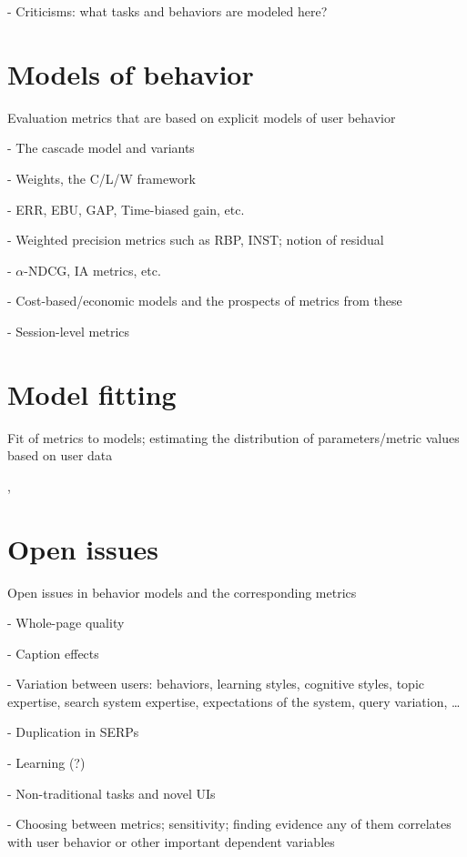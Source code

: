 \documentclass[openany]{now} %
\begin{document}
- Criticisms: what tasks and behaviors are modeled here?

\section{Models of behavior}

Evaluation metrics that are based on explicit models of user behavior

- The cascade model and variants

- Weights, the C/L/W framework \citep{Moffat2013}

- ERR, EBU, GAP, Time-biased gain, etc.

- Weighted precision metrics such as RBP, INST; notion of residual \citep{Moffat08,Moffat15}

- $\alpha$-NDCG, IA metrics, etc.

- Cost-based/economic models and the prospects of metrics from these

- Session-level metrics \cite{kanoulas2011evaluating} \cite{Järvelin2008}

\section{Model fitting}

Fit of metrics to models; estimating the distribution of parameters/metric values based on user data

\cite{CarteretteKY11}, \cite{Moffat2013}

\section{Open issues}

Open issues in behavior models and the corresponding metrics

- Whole-page quality

- Caption effects

- Variation between users: behaviors, learning styles, cognitive styles, topic expertise, search system expertise, expectations of the system, query variation, \dots

- Duplication in SERPs

- Learning (?)

- Non-traditional tasks and novel UIs

- Choosing between metrics; sensitivity; finding evidence any of them correlates with user behavior or other important dependent variables
\end{document}
